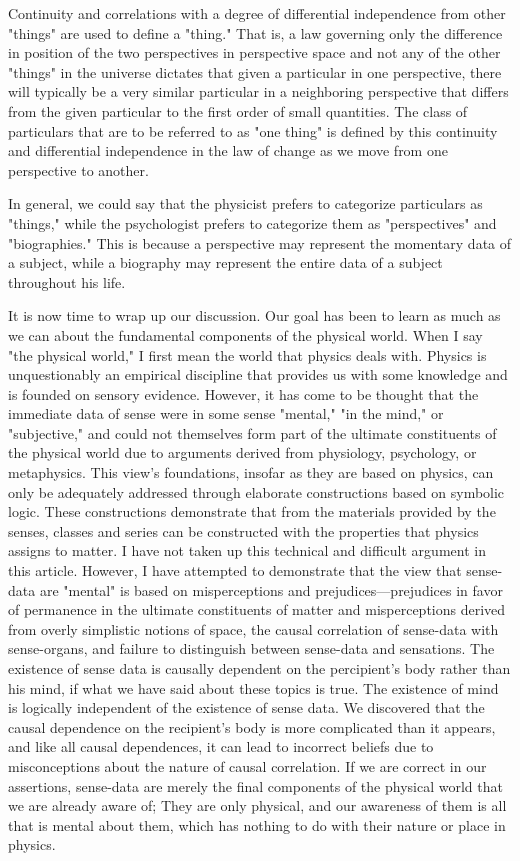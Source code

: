\documentclass[a4paper,12pt]{book}[2004/02/16]
\theoremstyle{ilemma}
\theoremstyle{itheorem}
\theoremstyle{iother}
\theoremstyle{icorollary}
\theoremstyle{numcorollary}
\theoremstyle{idefinition}
\begin{document}
Continuity and correlations with a degree of differential independence from other "things" are used to define a "thing." That is, a law governing only the difference in position of the two perspectives in perspective space and not any of the other "things" in the universe dictates that given a particular in one perspective, there will typically be a very similar particular in a neighboring perspective that differs from the given particular to the first order of small quantities. The class of particulars that are to be referred to as "one thing" is defined by this continuity and differential independence in the law of change as we move from one perspective to another.

In general, we could say that the physicist prefers to categorize particulars as "things," while the psychologist prefers to categorize them as "perspectives" and "biographies." This is because a perspective may represent the momentary data of a subject, while a biography may represent the entire data of a subject throughout his life.

It is now time to wrap up our discussion. Our goal has been to learn as much as we can about the fundamental components of the physical world. When I say "the physical world," I first mean the world that physics deals with. Physics is unquestionably an empirical discipline that provides us with some knowledge and is founded on sensory evidence. However, it has come to be thought that the immediate data of sense were in some sense "mental," "in the mind," or "subjective," and could not themselves form part of the ultimate constituents of the physical world due to arguments derived from physiology, psychology, or metaphysics. This view's foundations, insofar as they are based on physics, can only be adequately addressed through elaborate constructions based on symbolic logic. These constructions demonstrate that from the materials provided by the senses, classes and series can be constructed with the properties that physics assigns to matter. I have not taken up this technical and difficult argument in this article. However, I have attempted to demonstrate that the view that sense-data are "mental" is based on misperceptions and prejudices—prejudices in favor of permanence in the ultimate constituents of matter and misperceptions derived from overly simplistic notions of space, the causal correlation of sense-data with sense-organs, and failure to distinguish between sense-data and sensations. The existence of sense data is causally dependent on the percipient's body rather than his mind, if what we have said about these topics is true. The existence of mind is logically independent of the existence of sense data. We discovered that the causal dependence on the recipient's body is more complicated than it appears, and like all causal dependences, it can lead to incorrect beliefs due to misconceptions about the nature of causal correlation.
If we are correct in our assertions, sense-data are merely the final components of the physical world that we are already aware of; They are only physical, and our awareness of them is all that is mental about them, which has nothing to do with their nature or place in physics.
\end{document}
